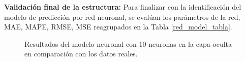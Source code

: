 \documentclass[12pt]{article}
\begin{document}
\newpage
\clearpage
\textbf{Validación final de la estructura:}
Para finalizar con la identificación del modelo de predicción por red neuronal, se evalúan los parámetros de la red, MAE, MAPE, RMSE, MSE reagrupados en la Tabla \ref{red_model_tabla}.

\begin{figure}[h!]
	\centering
	\captionsetup{justification=centering}
\caption{Resultados del modelo neuronal con 10 neuronas en la capa oculta en comparación con los datos reales.}
\end{figure}
\end{document}
